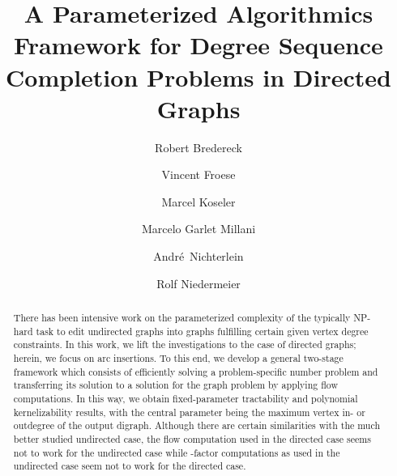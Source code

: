 \documentclass[a4paper,11pt]{article}
\theoremstyle{remark}
\theoremstyle{plain}
\theoremstyle{definition}
\begin{document}
\title{A Parameterized Algorithmics Framework for Degree Sequence Completion Problems in Directed Graphs}

\author[]{Robert Bredereck}
\author[]{Vincent Froese}
\author[]{Marcel Koseler}
\author[]{Marcelo Garlet Millani}
\author[]{André~Nichterlein}
\author[]{Rolf Niedermeier}

\date{}

\maketitle

\thispagestyle{scrheadings}
\cfoot{}
\ohead{}
\ifoot{}

\begin{abstract}
There has been intensive work on the parameterized complexity of
the typically NP-hard task to 
edit undirected graphs into graphs fulfilling certain given vertex degree 
constraints. In this work, we lift the investigations to the case of directed graphs; herein, we focus on arc insertions.
To this end, we develop a general two-stage framework which consists of efficiently solving a problem-specific number problem and transferring its solution to a solution for the graph problem by applying flow computations. In this way, we obtain fixed-parameter tractability and polynomial kernelizability
results, with the central parameter being the maximum vertex in- or outdegree of the output digraph.
Although there are certain similarities with the much better studied undirected case,
the flow computation used in the directed case seems not to 
work for the undirected case while -factor computations as used 
in the undirected case seem not to work for the directed case.
\end{abstract}
\end{document}
